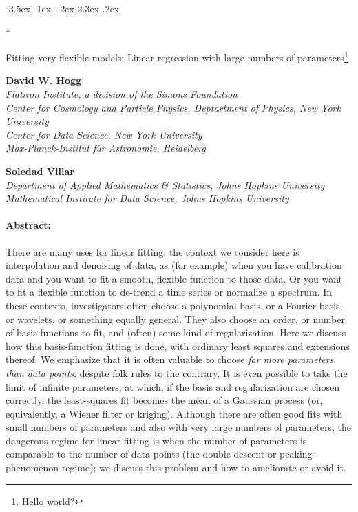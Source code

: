 \documentclass[12pt,letterpaper]{article}
\makeatletter
\renewcommand\section{\@startsection {section}{1}{\z@}%
  {-3.5ex \@plus -1ex \@minus -.2ex}%
  {2.3ex \@plus.2ex}%
  {\raggedright\normalfont\Large\bfseries}}
\makeatother
\begin{document}
\thispagestyle{plain}

\section*{\raggedright Fitting very flexible models: Linear regression with large numbers of parameters\footnote{Hello world?}}

\noindent
\textbf{David W. Hogg} \\
\textsl{\footnotesize Flatiron Institute, a division of the Simons Foundation \\
Center for Cosmology and Particle Physics, Deptartment of Physics, New York University \\
Center for Data Science, New York University \\
Max-Planck-Institut f\"ur Astronomie, Heidelberg}

\medskip
\noindent
\textbf{Soledad Villar} \\
\textsl{\footnotesize Department of Applied Mathematics \& Statistics, Johns Hopkins University \\
Mathematical Institute for Data Science, Johns Hopkins University}

\paragraph{Abstract:} There are many uses for linear fitting; the context we consider here is interpolation and denoising of data, as (for example) when you have calibration data and you want to fit a smooth, flexible function to those data.
Or you want to fit a flexible function to de-trend a time series or normalize a spectrum.
In these contexts, investigators often choose a polynomial basis, or a Fourier basis, or wavelets, or something equally general.
They also choose an order, or number of basis functions to fit, and (often) some kind of regularization.
Here we discuss how this basis-function fitting is done, with ordinary least squares and extensions thereof.
We emphasize that it is often valuable to choose \emph{far more parameters than data points}, despite folk rules to the contrary.
It is even possible to take the limit of infinite parameters, at which, if the basis and regularization are chosen correctly, the least-squares fit becomes the mean of a Gaussian process (or, equivalently, a Wiener filter or kriging).
Although there are often good fits with small numbers of parameters and also with very large numbers of parameters, the dangerous regime for linear fitting is when the number of parameters is comparable to the number of data points (the double-descent or peaking-phenomenon regime); we discuss this problem and how to ameliorate or avoid it.
\end{document}

